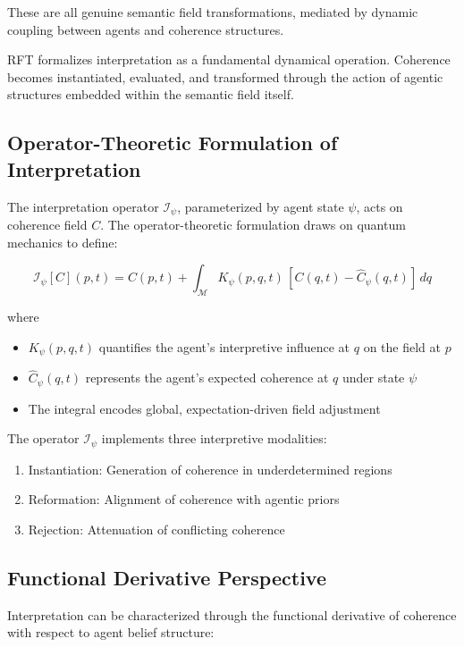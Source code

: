These are all genuine semantic field transformations, mediated by dynamic coupling between agents and coherence structures.

RFT formalizes interpretation as a fundamental dynamical operation. Coherence becomes instantiated, evaluated, and transformed through the action of agentic structures embedded within the semantic field itself.

\subsection{Operator-Theoretic Formulation of Interpretation}

The interpretation operator \(\mathcal{I}_{\psi}\), parameterized by agent state \(\psi\), acts on coherence field \(C\). The operator-theoretic formulation draws on quantum mechanics \autocite{vonNeumann1955} to define:

\begin{equation}
\mathcal{I}_{\psi}[C](p, t) = C(p, t) + \int_{\mathcal{M}} K_{\psi}(p, q, t)\, [C(q, t) - \hat{C}_{\psi}(q, t)]\, dq
\end{equation}

where
\begin{itemize}
    \item \(K_{\psi}(p, q, t)\) quantifies the agent's interpretive influence at \(q\) on the field at \(p\)
    \item \(\hat{C}_{\psi}(q, t)\) represents the agent's expected coherence at \(q\) under state \(\psi\)
    \item The integral encodes global, expectation-driven field adjustment
\end{itemize}

The operator \(\mathcal{I}_{\psi}\) implements three interpretive modalities:
\begin{enumerate}
    \item Instantiation: Generation of coherence in underdetermined regions
    \item Reformation: Alignment of coherence with agentic priors
    \item Rejection: Attenuation of conflicting coherence
\end{enumerate}

\subsection{Functional Derivative Perspective}

Interpretation can be characterized through the functional derivative of coherence with respect to agent belief structure:

